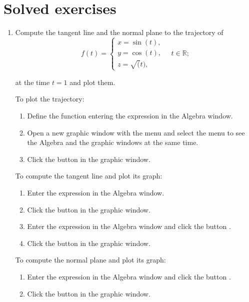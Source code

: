 \section{Solved exercises}
\begin{enumerate}[leftmargin=*]
\item Compute the tangent line and the normal plane to the trajectory of
\[
f(t)=
\begin{cases}
x=\sin(t),\\
y=\cos(t),\\
z=\sqrt(t),
\end{cases}
\quad t\in \mathbb{R};
\] 

at the time $t=1$ and plot them.
  
\begin{indication}
To plot the trajectory:
\begin{enumerate}
\item Define the function entering the expression  in the Algebra window.
\item Open a new graphic window with the menu  and select the menu  to see the Algebra and the graphic windows at the same time.
\item Click the button  in the graphic window.
\end{enumerate}
To compute the tangent line and plot its graph:
\begin{enumerate}
\item Enter the expression  in the Algebra window.
\item Click the button  in the graphic window.
\item Enter the expression  in the Algebra window and click the button .
\item Click the button  in the graphic window.
\end{enumerate}
To compute the normal plane and plot its graph:
\begin{enumerate}
\item Enter the expression  in the Algebra window and click the button .
\item Click the button  in the graphic window.
\end{enumerate}
\end{indication}  
  

\end{enumerate}
